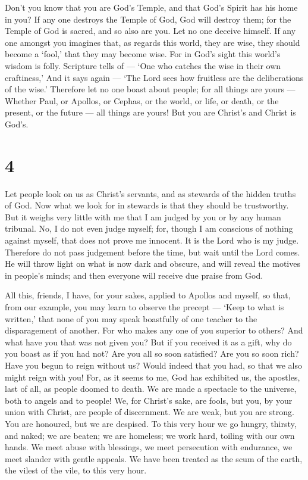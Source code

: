  Don't you know that you are God's Temple, and that God's
Spirit has his home in you?  If any one destroys the Temple
of God, God will destroy them; for the Temple of God is sacred, and so
also are you.  Let no one deceive himself. If any one
amongst you imagines that, as regards this world, they are wise, they
should become a `fool,' that they may become wise.  For in
God's sight this world's wisdom is folly. Scripture tells of --- `One
who catches the wise in their own craftiness,'  And it says
again --- `The Lord sees how fruitless are the deliberations of the
wise.'  Therefore let no one boast about people; for all
things are yours ---  Whether Paul, or Apollos, or Cephas,
or the world, or life, or death, or the present, or the future --- all
things are yours!  But you are Christ's and Christ is
God's.

\hypertarget{section-3}{%
\section{4}\label{section-3}}

 Let people look on us as Christ's servants, and as stewards
of the hidden truths of God.  Now what we look for in
stewards is that they should be trustworthy.  But it weighs
very little with me that I am judged by you or by any human tribunal.
No, I do not even judge myself;  for, though I am conscious
of nothing against myself, that does not prove me innocent. It is the
Lord who is my judge.  Therefore do not pass judgement
before the time, but wait until the Lord comes. He will throw light on
what is now dark and obscure, and will reveal the motives in people's
minds; and then everyone will receive due praise from God.

 All this, friends, I have, for your sakes, applied to
Apollos and myself, so that, from our example, you may learn to observe
the precept --- `Keep to what is written,' that none of you may speak
boastfully of one teacher to the disparagement of another. 
For who makes any one of you superior to others? And what have you that
was not given you? But if you received it as a gift, why do you boast as
if you had not?  Are you all so soon satisfied? Are you so
soon rich? Have you begun to reign without us? Would indeed that you
had, so that we also might reign with you!  For, as it seems
to me, God has exhibited us, the apostles, last of all, as people doomed
to death. We are made a spectacle to the universe, both to angels and to
people!  We, for Christ's sake, are fools, but you, by your
union with Christ, are people of discernment. We are weak, but you are
strong. You are honoured, but we are despised.  To this
very hour we go hungry, thirsty, and naked; we are beaten; we are
homeless;  we work hard, toiling with our own hands. We
meet abuse with blessings, we meet persecution with endurance,
 we meet slander with gentle appeals. We have been treated
as the scum of the earth, the vilest of the vile, to this very hour.


